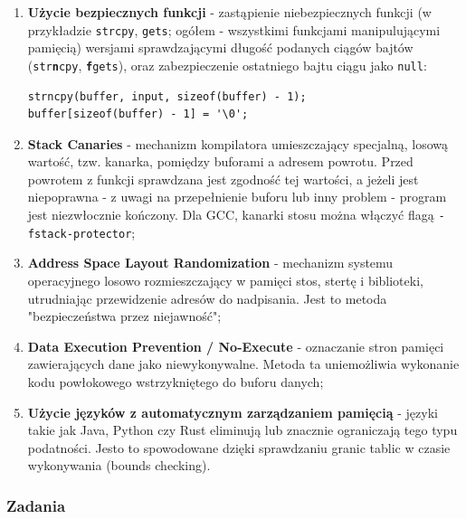 \documentclass[12pt,a4paper]{article}
\begin{document}
\begin{enumerate}
    \item \textbf{Użycie bezpiecznych funkcji} - zastąpienie niebezpiecznych funkcji (w przykładzie \texttt{strcpy}, \texttt{gets}; ogółem - wszystkimi funkcjami manipulującymi pamięcią) wersjami sprawdzającymi 
    długość podanych ciągów bajtów (\texttt{str\textbf{n}cpy}, \texttt{\textbf{f}gets}), oraz zabezpieczenie ostatniego bajtu ciągu jako \verb|null|:
\begin{tcolorbox}
\begin{verbatim}
strncpy(buffer, input, sizeof(buffer) - 1);
buffer[sizeof(buffer) - 1] = '\0';
\end{verbatim}
\end{tcolorbox}

    \item \textbf{Stack Canaries} - mechanizm kompilatora umieszczający specjalną, losową wartość, tzw. kanarka, pomiędzy buforami a adresem powrotu. Przed powrotem z funkcji
          sprawdzana jest zgodność tej wartości, a jeżeli jest niepoprawna - z uwagi na przepełnienie buforu lub inny problem - program jest niezwłocznie kończony. 
          Dla GCC, kanarki stosu można włączyć flagą  \texttt{-fstack-protector};

    \item \textbf{Address Space Layout Randomization} - mechanizm systemu operacyjnego losowo rozmieszczający w pamięci stos, stertę i biblioteki, utrudniając przewidzenie adresów do nadpisania. 
            Jest to metoda "bezpieczeństwa przez niejawność";

    \item \textbf{Data Execution Prevention / No-Execute} - oznaczanie stron pamięci zawierających dane jako niewykonywalne. Metoda ta uniemożliwia wykonanie kodu powłokowego wstrzykniętego do buforu danych;

    \item \textbf{Użycie języków z automatycznym zarządzaniem pamięcią} - języki takie jak Java, Python czy Rust eliminują lub znacznie ograniczają tego typu podatności. Jesto to spowodowane dzięki sprawdzaniu 
            granic tablic w czasie wykonywania (bounds checking).
\end{enumerate}


\subsubsection{Zadania}
 
\end{document}
